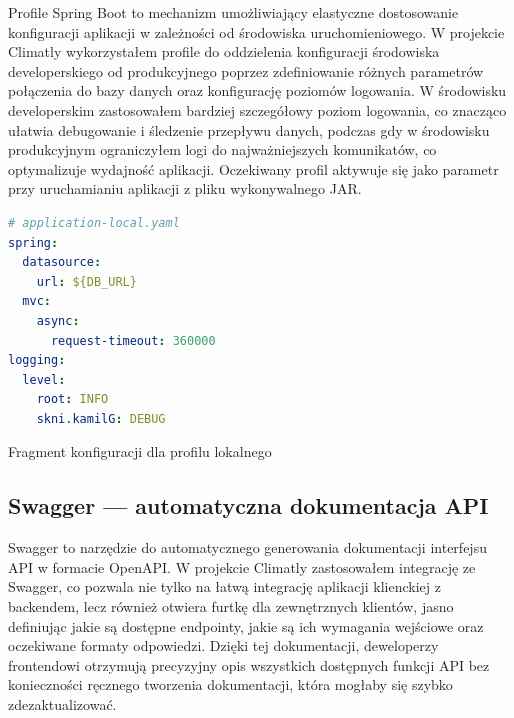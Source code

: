 \documentclass[a4paper,12pt,openany]{book}
\begin{document}
Profile Spring Boot to mechanizm umożliwiający elastyczne dostosowanie konfiguracji aplikacji w zależności od środowiska uruchomieniowego. W projekcie Climatly wykorzystałem profile do oddzielenia konfiguracji środowiska developerskiego od produkcyjnego poprzez zdefiniowanie różnych parametrów połączenia do bazy danych oraz konfigurację poziomów logowania. W środowisku developerskim zastosowałem bardziej szczegółowy poziom logowania, co znacząco ułatwia debugowanie i śledzenie przepływu danych, podczas gdy w środowisku produkcyjnym ograniczyłem logi do najważniejszych komunikatów, co optymalizuje wydajność aplikacji. Oczekiwany profil aktywuje się jako parametr przy uruchamianiu aplikacji z pliku wykonywalnego JAR.

\begin{lstfloat}[H]
\begin{lstlisting}[language=yaml]
# application-local.yaml
spring:
  datasource:
    url: ${DB_URL}
  mvc:
    async:
      request-timeout: 360000
logging:
  level:
    root: INFO
    skni.kamilG: DEBUG
\end{lstlisting}
\caption{Fragment konfiguracji dla profilu lokalnego}
\label{lst:profile-local}
\end{lstfloat}

\subsection*{Swagger --- automatyczna dokumentacja API}

Swagger to narzędzie do automatycznego generowania dokumentacji interfejsu API w formacie OpenAPI. W projekcie Climatly zastosowałem integrację ze Swagger, co pozwala nie tylko na łatwą integrację aplikacji klienckiej z backendem, lecz również otwiera furtkę dla zewnętrznych klientów, jasno definiując jakie są dostępne endpointy, jakie są ich wymagania wejściowe oraz oczekiwane formaty odpowiedzi. Dzięki tej dokumentacji, deweloperzy frontendowi otrzymują precyzyjny opis wszystkich dostępnych funkcji API bez konieczności ręcznego tworzenia dokumentacji, która mogłaby się szybko zdezaktualizować.
\end{document}
